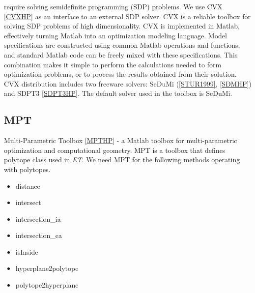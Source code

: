 \documentclass[letterpaper,10pt,english]{sphinxmanual}
\begin{document}
require solving semidefinite programming (SDP) problems.
We use CVX {\hyperref[chap_install:cvxhp]{{[}CVXHP{]}}} as an interface to an external SDP solver. CVX is a
reliable toolbox for solving SDP problems of high dimensionality. CVX is
implemented in Matlab, effectively turning Matlab into an optimization
modeling language. Model specifications are constructed using common
Matlab operations and functions, and standard Matlab code can be freely
mixed with these specifications. This combination makes it simple to
perform the calculations needed to form optimization problems, or to
process the results obtained from their solution. CVX distribution
includes two freeware solvers: SeDuMi ({\hyperref[chap_install:stur1999]{{[}STUR1999{]}}}, {\hyperref[chap_install:sdmhp]{{[}SDMHP{]}}})
and SDPT3 {\hyperref[chap_install:sdpt3hp]{{[}SDPT3HP{]}}}. The default solver used in the toolbox
is SeDuMi.


\subsection{MPT}
\label{chap_install:mpt}
Multi-Parametric Toolbox {\hyperref[chap_install:mpthp]{{[}MPTHP{]}}} - a
Matlab toolbox for multi-parametric optimization and computational
geometry. MPT is a toolbox that defines polytope class used in \emph{ET}. We
need MPT for the following methods operating with polytopes.
\begin{itemize}
\item {} 
distance

\item {} 
intersect

\item {} 
intersection\_ia

\item {} 
intersection\_ea

\item {} 
isInside

\item {} 
hyperplane2polytope

\item {} 
polytope2hyperplane

\end{itemize}
\end{document}
